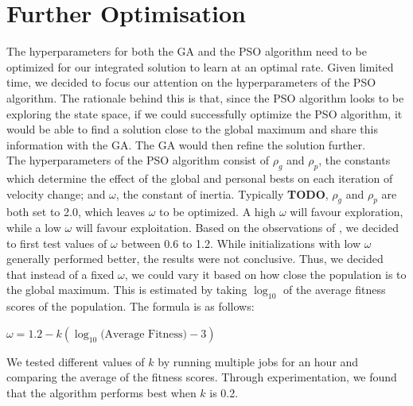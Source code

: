 \documentclass[12pt]{article}
\begin{document}
	\section{Further Optimisation}
	The hyperparameters for both the GA and the PSO algorithm need
	to be optimized for our integrated solution to learn at an optimal rate.
	Given limited time, we decided to focus our attention on the hyperparameters
	of the PSO algorithm. The rationale behind this is that, since the PSO
	algorithm looks to be exploring the state space, if we could successfully optimize
	the PSO algorithm, it would be able to find a solution close to the global
	maximum and share this information with the GA.
	The GA would then refine the solution further.\\

	The hyperparameters of the PSO algorithm consist of $\rho_g$ and $\rho_p$, the constants
	which determine the effect of the global and personal bests on each iteration
	of velocity change; and $\omega$, the constant of inertia. Typically \textbf{TODO}, $\rho_g$ and $\rho_p$ are both
	set to 2.0, which leaves $\omega$ to be optimized. A high $\omega$ will favour exploration,
	while a low $\omega$ will favour exploitation. Based on the observations of
	\cite{shi1998parameter}, we decided to first test values of $\omega$ between 0.6 to 1.2.
	While initializations with low $\omega$ generally performed better, the results were
	not conclusive. Thus, we decided that instead of a fixed $\omega$, we could vary it
	based on how close the population is to the global maximum. This is estimated
	by taking $\log_{10}$ of the average fitness scores of the population. The formula is as follows:

	\begin{center}
		$\omega = 1.2 - k(\log_{10}\text{(Average Fitness)} - 3)$
	\end{center}

	We tested different values of $k$ by running multiple jobs for an hour and comparing
 	the average of the fitness scores. Through experimentation, we found that the
	algorithm performs best when $k$ is 0.2.\\


\end{document}
